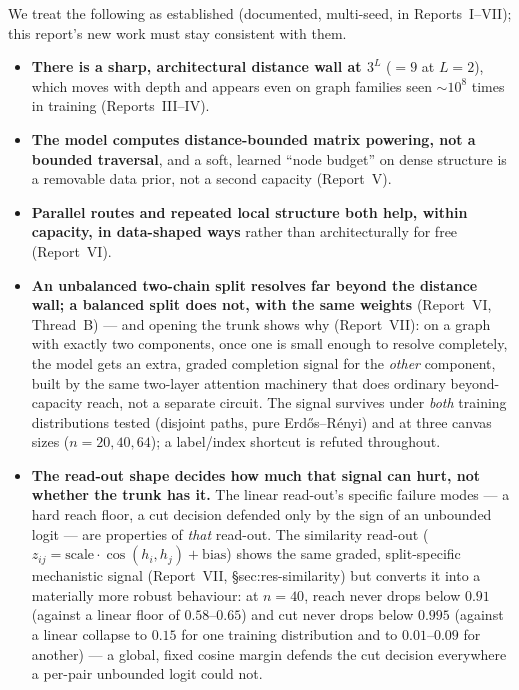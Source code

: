 \documentclass[11pt,a4paper]{article}
\begin{document}
We treat the following as established (documented, multi-seed, in
Reports~I--VII); this report's new work must stay consistent with them.

\begin{itemize}\setlength\itemsep{0.2em}
  \item \textbf{There is a sharp, architectural distance wall at $3^L$} ($=9$
        at $L=2$), which moves with depth and appears even on graph families
        seen $\sim10^8$ times in training (Reports~III--IV).
  \item \textbf{The model computes distance-bounded matrix powering, not a
        bounded traversal}, and a soft, learned ``node budget'' on dense
        structure is a removable data prior, not a second capacity
        (Report~V).
  \item \textbf{Parallel routes and repeated local structure both help,
        within capacity, in data-shaped ways} rather than architecturally for
        free (Report~VI).
  \item \textbf{An unbalanced two-chain split resolves far beyond the
        distance wall; a balanced split does not, with the same weights}
        (Report~VI, Thread~B) --- and opening the trunk shows why
        (Report~VII): on a graph with exactly two components, once one is
        small enough to resolve completely, the model gets an extra,
        graded completion signal for the \emph{other} component, built by
        the same two-layer attention machinery that does ordinary
        beyond-capacity reach, not a separate circuit. The signal survives
        under \emph{both} training distributions tested (disjoint paths,
        pure Erd\H{o}s--R\'enyi) and at three canvas sizes ($n=20,40,64$); a
        label/index shortcut is refuted throughout.
  \item \textbf{The read-out shape decides how much that signal can hurt, not
        whether the trunk has it.} The linear read-out's specific failure
        modes --- a hard reach floor, a cut decision defended only by the
        sign of an unbounded logit --- are properties of \emph{that}
        read-out. The similarity read-out
        ($z_{ij}=\mathrm{scale}\cdot\cos(h_i,h_j)+\mathrm{bias}$) shows the
        same graded, split-specific mechanistic signal (Report~VII,
        \S sec:res-similarity) but converts it into a materially more robust
        behaviour: at $n=40$, reach never drops below $0.91$ (against a
        linear floor of $0.58$--$0.65$) and cut never drops below $0.995$
        (against a linear collapse to $0.15$ for one training distribution
        and to $0.01$--$0.09$ for another) --- a global, fixed cosine margin
        defends the cut decision everywhere a per-pair unbounded logit could
        not.
\end{itemize}
\end{document}
